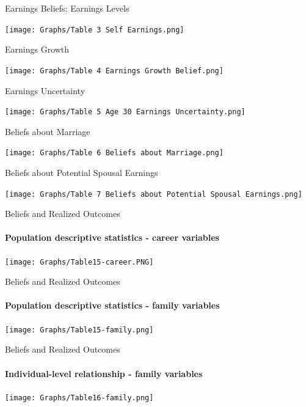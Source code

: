 \documentclass[12pt]{beamer}
\begin{document}
\begin{frame}{Earnings Beliefs: Earnings Levels}
    \begin{center}
    \texttt{[image: Graphs/Table 3 Self Earnings.png]}
    \end{center}
\end{frame}

\begin{frame}{Earnings Growth}
    \begin{center}
    \texttt{[image: Graphs/Table 4 Earnings Growth Belief.png]}
    \end{center}
\end{frame}

\begin{frame}{Earnings Uncertainty}
    \begin{center}
    \texttt{[image: Graphs/Table 5 Age 30 Earnings Uncertainty.png]}
    \end{center}
\end{frame}

\begin{frame}{Beliefs about Marriage}
    \begin{center}
    \texttt{[image: Graphs/Table 6 Beliefs about Marriage.png]}
    \end{center}
\end{frame}

\begin{frame}{Beliefs about Potential Spousal Earnings}
    \begin{center}
    \texttt{[image: Graphs/Table 7 Beliefs about Potential Spousal Earnings.png]}
    \end{center}
\end{frame}

\begin{frame}{Beliefs and Realized Outcomes}
    \begin{center}
    \framesubtitle{Population descriptive statistics - career variables}
    \texttt{[image: Graphs/Table15-career.PNG]}
    \end{center}
\end{frame}

\begin{frame}{Beliefs and Realized Outcomes}
    \begin{center}
    \framesubtitle{Population descriptive statistics - family variables}
    \texttt{[image: Graphs/Table15-family.png]}
    \end{center}
\end{frame}

\begin{frame}{Beliefs and Realized Outcomes}
    \begin{center}
    \framesubtitle{Individual-level relationship - family variables}
    \texttt{[image: Graphs/Table16-family.png]}
    \end{center}
\end{frame}
\end{document}
